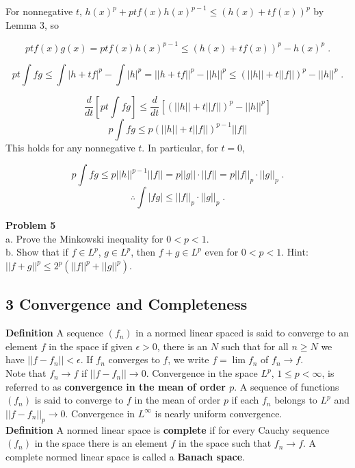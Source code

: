 \documentclass[a4paper]{article}
\begin{document}
For nonnegative $t$, $h(x)^p + ptf(x)h(x)^{p-1} \leq (h(x) + tf(x))^p$ by Lemma 3, so

$$ptf(x)g(x) = ptf(x)h(x)^{p-1} \leq (h(x) + tf(x))^p - h(x)^p \;.$$

$$ pt\int fg \leq \int |h + tf|^p - \int |h|^p = ||h+tf||^p - ||h||^p \leq \left(||h|| + t||f||\right)^p - ||h||^p \;.$$

$$\frac{d}{dt}\left[ pt\int fg \right] \leq \frac{d}{dt} \left[ \left(||h|| + t||f||\right)^p - ||h||^p \right] $$
$$p\int fg \leq p\left(||h|| + t||f||\right)^{p-1}||f|| $$
This holds for any nonnegative $t$. In particular, for $t = 0$,

$$ p\int fg \leq p||h||^{p-1}||f|| = p ||g|| \cdot ||f|| = p ||f||_p \cdot ||g||_p \;.$$
$$\therefore \int |fg| \leq ||f||_p \cdot ||g||_p \;.$$

{\bf Problem 5}\\

a. Prove the Minkowski inequality for $0 < p < 1$. \\

b. Show that if $f \in L^p$, $g \in L^p$, then $f+g \in L^p$ even for $0<p<1$. Hint: $||f+g||^p \leq 2^p \left( ||f||^p + ||g||^p \right)$. \\

\subsection*{3 Convergence and Completeness}

{\bf Definition} A sequence $(f_n)$ in a normed linear spaced is said to converge to an element $f$ in the space if given $\epsilon > 0$, there is an $N$ such that for all $n\geq N$ we have $||f - f_n|| < \epsilon$. If $f_n$ converges to $f$, we write $f = \lim f_n$ of $f_n \rightarrow f$. \\

Note that $f_n \rightarrow f$ if $||f- f_n|| \rightarrow 0$. Convergence in the space $L^p$, $1\leq p < \infty$, is referred to as {\bf convergence in the mean of order $p$}. A sequence of functions $(f_n)$ is said to converge to $f$ in the mean of order $p$ if each $f_n$ belongs to $L^p$ and $||f- f_n||_p \rightarrow 0$. Convergence in $L^\infty$ is nearly uniform convergence. \\

{\bf Definition} A normed linear space is {\bf complete} if for every Cauchy sequence $(f_n)$ in the space there is an element $f$ in the space such that $f_n \rightarrow f$. A complete normed linear space is called a {\bf Banach space}. \\
\end{document}
